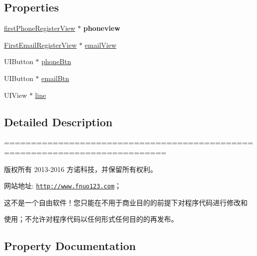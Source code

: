 \subsection*{Properties}
\begin{DoxyCompactItemize}
\item 
\mbox{\label{category_forget_view_controller_07_08_aab834de1d6660235319865767e321ef9}} 
\mbox{\hyperlink{interfacefirst_phone_register_view}{first\+Phone\+Register\+View}} $\ast$ {\bfseries phoneview}
\item 
\mbox{\hyperlink{interface_first_email_register_view}{First\+Email\+Register\+View}} $\ast$ \mbox{\hyperlink{category_forget_view_controller_07_08_a0eb71b3636b3d826a1424eb895540a93}{email\+View}}
\item 
U\+I\+Button $\ast$ \mbox{\hyperlink{category_forget_view_controller_07_08_a46db1ba402946f379663393af5cc094a}{phone\+Btn}}
\item 
U\+I\+Button $\ast$ \mbox{\hyperlink{category_forget_view_controller_07_08_a957571ece5f0c6c60941ce084e36db68}{email\+Btn}}
\item 
U\+I\+View $\ast$ \mbox{\hyperlink{category_forget_view_controller_07_08_acaef1912753fb682695953539772b29f}{line}}
\end{DoxyCompactItemize}


\subsection{Detailed Description}
============================================================================

版权所有 2013-\/2016 方诺科技，并保留所有权利。

网站地址\+: \href{http://www.fnuo123.com}{\tt http\+://www.\+fnuo123.\+com}； 



这不是一个自由软件！您只能在不用于商业目的的前提下对程序代码进行修改和

使用；不允许对程序代码以任何形式任何目的的再发布。 

 

\subsection{Property Documentation}
\mbox{\label{category_forget_view_controller_07_08_a957571ece5f0c6c60941ce084e36db68}} 
